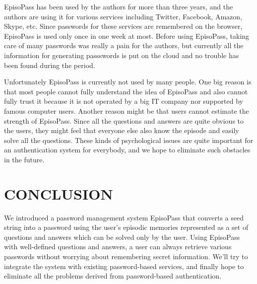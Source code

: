 \documentclass{sigchi}
\begin{document}
EpisoPass has been used by the authors for more than three years, and
the authors are using it for various services including
Twitter, Facebook, Amazon, Skype, etc.
Since passwords for these services are remembered on the browser,
EpisoPass is used only once in one week at most.
%
Before using EpisoPass, taking care of many passwords was really
a pain for the authors, but
currently all the information for generating passswords is put on the cloud
and no trouble has been found during the period.

Unfortunately EpisoPass is currently not used by many people.
One big reason is that most people cannot fully understand the
idea of EpisoPass and also cannot fully trust it
because it is not operated by a big IT company nor supported by
famous computer users.
Another reason might be that users cannot estimate the strength
of EpisoPass.
Since all the questions and answers are
quite obvious to the users,
they might feel that everyone else also know the episode
and easily solve all the questions.
These kinds of psychological issues are quite important for
an authentication system for everybody,
and we hope to eliminate such obstacles in the future.

\section{CONCLUSION}

We introduced a password management system EpisoPass
that converts a seed string into a password using the user's
episodic memories represented as a set of questions and answers
which can be solved only by the user.
%
Using EpisoPass with well-defined questions and answers,
a user can always retrieve various passwords without worrying about
remembering secret information.
%
We'll try to integrate the system with existing password-based
services, and finally hope to eliminate all the problems
derived from password-based authentication.

%
%
\end{document}
